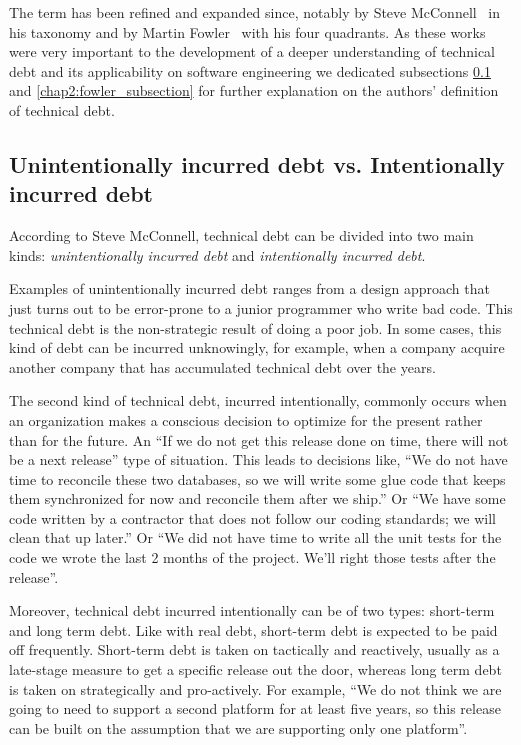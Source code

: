 The term has been refined and expanded since, notably by Steve McConnell~\cite{McConnell07:TechnicalDebt} in his taxonomy and by Martin Fowler~\cite{MartinFowler:TechnicalDebtQuadrant} with his four quadrants. As these works were very important to the development of a deeper understanding of technical debt and its applicability on software engineering we dedicated subsections \ref{chap2:mcconnel_subsection} and \ref{chap2:fowler_subsection} for further explanation on the authors' definition of technical debt. 

\subsection{Unintentionally incurred debt vs. Intentionally incurred debt}
\label{chap2:mcconnel_subsection}

According to Steve McConnell, technical debt can be divided into two main kinds: \textit{unintentionally incurred debt} and \textit{intentionally incurred debt}.

Examples of unintentionally incurred debt ranges from a design approach that just turns out to be error-prone to a junior programmer who  write bad code. This technical debt is the non-strategic result of doing a poor job. In some cases, this kind of debt can be incurred unknowingly, for example, when a company acquire another company that has accumulated technical debt over the years. 

The second kind of technical debt, incurred intentionally, commonly occurs when an organization makes a conscious decision to optimize for the present rather than for the future. An ``If we do not get this release done on time, there will not be a next release'' type of situation. This leads to decisions like, ``We do not have time to reconcile these two databases, so we will write some glue code that keeps them synchronized for now and reconcile them after we ship.'' Or ``We have some code written by a contractor that does not follow our coding standards; we will clean that up later.'' Or ``We did not have time to write all the unit tests for the code we wrote the last 2 months of the project. We'll right those tests after the release''. 

Moreover, technical debt incurred intentionally can be of two types: short-term and long term debt. Like with real debt, short-term debt is expected to be paid off frequently. Short-term debt is taken on tactically and reactively, usually as a late-stage measure to get a specific release out the door, whereas long term debt is taken on strategically and pro-actively. For example, ``We do not think we are going to need to support a second platform for at least five years, so this release can be built on the assumption that we are supporting only one platform''.

